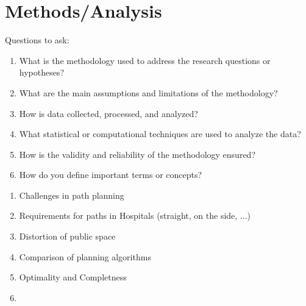 \chapter{Methods/Analysis}
\label{sec:methods}
Questions to ask:
\begin{enumerate}
    \item What is the methodology used to address the research questions or hypotheses?
    \item What are the main assumptions and limitations of the methodology?
    \item How is data collected, processed, and analyzed? 
    \item What statistical or computational techniques are used to analyze the data? 
    \item How is the validity and reliability of the methodology ensured? 
    \item How do you define important terms or concepts?
\end{enumerate}

\begin{enumerate}
    \item Challenges in path planning
    \item Requirements for paths in Hospitals (straight, on the side, ...)
    \item Distortion of public space
    \item Comparison of planning algorithms
    \item Optimality and Completness
    \item 
\end{enumerate}